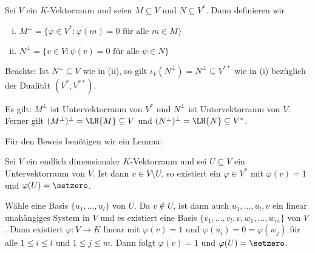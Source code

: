 \begin{definition}
	\label{def:12.13}
	Sei $V$ ein $K$-Vektorraum und seien $M \subseteq V$ und $N \subseteq V^*$.
	Dann definieren wir
	\begin{enumerate}[(i)]
		\item $M^\perp = \{ \varphi \in V^* : \varphi(m) = 0 \text{ für alle } m \in M\}$
		\item $N^\perp = \{ v \in V : \psi(v) = 0 \text{ für alle } \psi \in N\}$
	\end{enumerate}
\end{definition}

Beachte: Ist $N^\perp \subseteq V$ wie in (ii), so gilt $\iota_V(N^\perp) = N^\perp \subseteq V^{**}$ wie in (i) bezüglich der Dualität $(V^*,V^{**})$.

\begin{satz}
	\label{satz:12.14}
	Es gilt: $M^\perp$ ist Untervektorraum von $V^*$ und $N^\perp$ ist Untervektorraum von $V$.
	Ferner gilt $(M^\perp)^\perp = \LH\{M\} \subseteq V$ und $(N^\perp)^\perp = \LH\{N\} \subseteq V^*$.
\end{satz}

Für den Beweis benötigen wir ein Lemma:

\begin{lemma}
	\label{lemma:12.15}
	Sei $V$ ein endlich dimensionaler $K$-Vektorraum und sei $U \subseteq V$ ein Untervektorraum von $V$.
	Ist dann $v \in V \setminus U$, so existiert ein $\varphi \in V^*$ mit $\varphi(v) =1$ und $\varphi(U) = \setzero$.
\end{lemma}

\begin{beweis}
	Wähle eine Basis $\{u_1,\dots,u_l\}$ von $U$.
	Da $v \notin U$, ist dann auch $u_1,\dots,u_l,v$ ein linear unahängiges System in $V$ und es existiert eine Basis $\{v_1,\dots,v_l,v,w_1,\dots,w_m\}$ von $V$.
	Dann existiert $\varphi \colon V \rightarrow K$ linear mit $\varphi(v) = 1$ und $\varphi(u_i) = 0 = \varphi(w_j)$ für alle $1 \leq i \leq l$ und $1 \leq j \leq m$.
	Dann folgt $\varphi(v) = 1$ und $\varphi(U) = \setzero$. 
\end{beweis}

